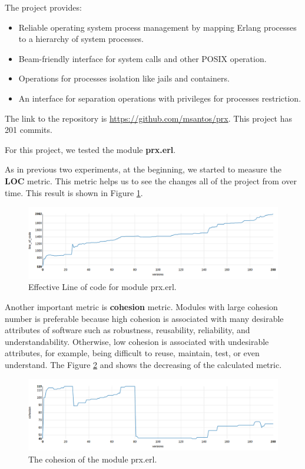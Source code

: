The project provides:

\begin{itemize}
	\item Reliable operating system process management by mapping Erlang processes to a hierarchy of system processes.
	\item Beam-friendly interface for system calls and other POSIX operation.
	\item Operations for processes isolation like jails and containers.
	\item An interface for separation operations with privileges for processes restriction.
\end{itemize}


The link to the repository is \url{https://github.com/msantos/prx}. This project has 201 commits. 

For this project, we tested the module \textbf{prx.erl}. 

As in previous two experiments, at the beginning, we started to measure the \textbf{LOC} metric. This metric helps us to see the changes all of the project from over time. This result is shown in Figure \ref{fig:line_of_code_prx}.

\begin{figure}[ht]
	\centering
	\includegraphics[width=\textwidth]{figures/line_of_code_prx.png}
	\caption{Effective Line of code for module prx.erl.}
	\label{fig:line_of_code_prx}
\end{figure}

Another important metric is \textbf{cohesion} metric. Modules with large cohesion number is preferable because high cohesion is associated with many desirable attributes of software such as robustness, reusability, reliability, and understandability. Otherwise, low cohesion is associated with undesirable attributes, for example, being difficult to reuse, maintain, test, or even understand. The Figure \ref{fig:cohesion_prx} and shows the decreasing of the calculated metric. 

\begin{figure}[ht]
	\centering
	\includegraphics[width=\textwidth]{figures/cohesion_prx.png}
	\caption{The cohesion of the module prx.erl.}
	\label{fig:cohesion_prx}
\end{figure}

